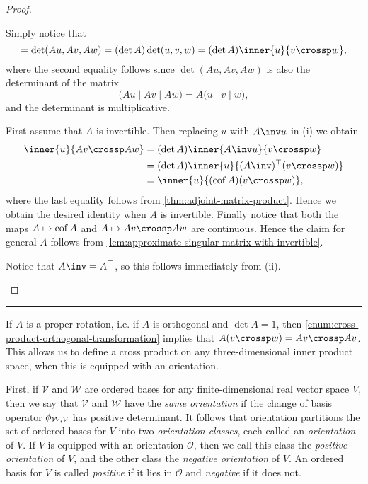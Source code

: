 \documentclass[article, a4paper, 11pt, oneside]{memoir}
\numberwithin{equation}{chapter}
\newcommand{\calV}{\mathcal{V}}
\newcommand{\calW}{\mathcal{W}}
\newcommand{\trans}{^{\top}}
\newcommand\fleuronbreak{\fancybreak{\textcolor{linkcolor}{\adfhangingflatleafleft}}}
\begin{document}
\begin{proof}
\begin{proofsec}
    \item[Proof of (i)]
    Simply notice that
    \begin{equation*}
        [Au, Av, Aw]
            = \det(Au, Av, Aw)
            = (\det A) \det(u,v,w)
            = (\det A) \inner{u}{v \crossp w},
    \end{equation*}
    where the second equality follows since $\det(Au, Av, Aw)$ is also the determinant of the matrix
    \begin{equation*}
        \bigl( Au \mid Av \mid Aw \bigr)
            = A \bigl( u \mid v \mid w \bigr),
    \end{equation*}
    and the determinant is multiplicative.

    \item[Proof of (ii)]
    First assume that $A$ is invertible. Then replacing $u$ with $A\inv u$ in (i) we obtain
    \begin{align*}
        \inner{u}{Av \crossp Aw}
            &= (\det A) \inner{A\inv u}{v \crossp w} \\
            &= (\det A) \inner{u}{(A\inv)\trans (v \crossp w)} \\
            &=  \inner{u}{(\cof A)(v \crossp w)},
    \end{align*}
    where the last equality follows from \cref{thm:adjoint-matrix-product}. Hence we obtain the desired identity when $A$ is invertible. Finally notice that both the maps $A \mapsto \operatorname{cof} A$ and $A \mapsto Av \crossp Aw$ are continuous. Hence the claim for general $A$ follows from \cref{lem:approximate-singular-matrix-with-invertible}.

    \item[Proof of (iii)]
    Notice that $A\inv = A\trans$, so this follows immediately from (ii).
\end{proofsec}
\end{proof}

\fleuronbreak

If $A$ is a proper rotation, i.e. if $A$ is orthogonal and $\det A = 1$, then \cref{enum:cross-product-orthogonal-transformation} implies that $A(v \crossp w) = Av \crossp Av$. This allows us to define a cross product on any three-dimensional inner product space, when this is equipped with an orientation.

\newcommand{\calO}{\mathcal{O}}

First, if $\calV$ and $\calW$ are ordered bases for any finite-dimensional real vector space $V$, then we say that $\calV$ and $\calW$ have the \emph{same orientation} if the change of basis operator $\basischange{\calW}{\calV}$ has positive determinant. It follows that orientation partitions the set of ordered bases for $V$ into two \emph{orientation classes}, each called an \emph{orientation} of $V$. If $V$ is equipped with an orientation $\calO$, then we call this class the \emph{positive orientation} of $V$, and the other class the \emph{negative orientation} of $V$. An ordered basis for $V$ is called \emph{positive} if it lies in $\calO$ and \emph{negative} if it does not.
\end{document}
